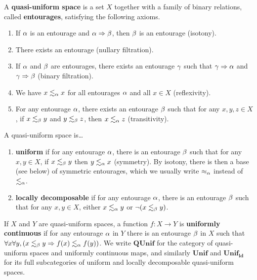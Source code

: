 \documentclass{article}
\def\leapx{\lesssim}
\def\ent#1{\leapx_{#1}}
\let\implies\Rightarrow
\def\nn{\ensuremath{\neg\neg}}
\def\QUnif{\mathbf{QUnif}}
\def\Unif{\mathbf{Unif}}
\def\Unifnn{\mathbf{Unif}_{\nn}}
\def\ldUnif{\mathbf{Unif}_{\mathbf{ld}}}
\begin{document}
\begin{defn}
  A \textbf{quasi-uniform space} is a set $X$ together with a family of binary relations, called \textbf{entourages}, satisfying the following axioms.
  \begin{enumerate}
  \item If $\alpha$ is an entourage and $\al\implies\be$, then $\beta$ is an entourage (isotony).
  \item There exists an entourage (nullary filtration).
  \item If $\alpha$ and $\beta$ are entourages, there exists an entourage $\gamma$ such that $\gm\implies\al$ and $\gm\implies\be$ (binary filtration).
  \item We have $x\ent\al x$ for all entourages $\alpha$ and all $x\in X$ (reflexivity).
  \item For any entourage $\alpha$, there exists an entourage $\beta$ such that for any $x,y,z\in X$, if $x\ent\be y$ and $y\ent\be z$, then $x\ent\al z$ (transitivity).
  \end{enumerate}
  A quasi-uniform space is\dots
  \begin{enumerate}[resume]
  \item \textbf{uniform} if for any entourage $\alpha$, there is an entourage $\beta$ such that for any $x,y\in X$, if $x\ent\be y$ then $y\ent\al x$ (symmetry).
    By isotony, there is then a base (see below) of symmetric entourages, which we usually write $\approx_\alpha$ instead of $\ent\al$.
  \item \textbf{locally decomposable} if for any entourage $\alpha$, there is an entourage $\beta$ such that for any $x,y\in X$, either $x\ent\al y$ or $\neg(x\ent\be y)$.
  \end{enumerate}
  If $X$ and $Y$ are quasi-uniform spaces, a function $f:X\to Y$ is \textbf{uniformly continuous} if for any entourage $\alpha$ in $Y$ there is an entourage $\beta$ in $X$ such that $\forall x\forall y, (x\ent\be y \implies f(x)\ent\al f(y))$.
  We write $\QUnif$ for the category of quasi-uniform spaces and uniformly continuous maps, and similarly
  $\Unif$ and $\ldUnif$ for its full subcategories of uniform %
  and locally decomposable quasi-uniform spaces.
\end{defn}
\end{document}
